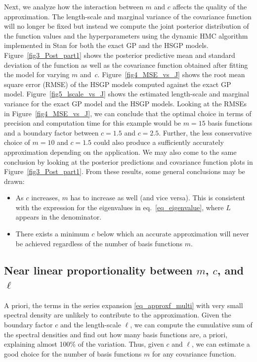 Next, we analyze how the interaction between $m$ and $c$ affects the quality of the approximation. The length-scale and marginal variance of the covariance function will no longer be fixed but instead we compute the joint posterior distribution of the function values and the hyperparameters using the dynamic HMC algorithm implemented in Stan \citep{StanTeam:2021} for both the exact GP and the HSGP models. Figure~\ref{fig3_Post_part1} shows the posterior predictive mean and standard deviation of the function as well as the covariance function obtained after fitting the model for varying $m$ and~$c$. Figure~\ref{fig4_MSE_vs_J} shows the root mean square error (RMSE) of the HSGP models computed against the exact GP model. Figure~\ref{fig5_lscale_vs_J} shows the estimated length-scale and marginal variance for the exact GP model and the HSGP models. Looking at the RMSEs in Figure~\ref{fig4_MSE_vs_J}, we can conclude that the optimal choice in terms of precision and computation time for this example would be $m = 15$ basis functions and a boundary factor between $c = 1.5$ and $c = 2.5$. Further, the less conservative choice of $m = 10$ and $c = 1.5$ could also produce a sufficiently accurately approximation depending on the application. We may also come to the same conclusion by looking at the posterior predictions and covariance function plots in Figure~\ref{fig3_Post_part1}. From these results, some general conclusions may be drawn:
%
\begin{itemize}
\item As $c$ increases, $m$ has to increase as well (and vice versa). This is consistent with the expression for the eigenvalues in eq.~\eqref{eq_eigenvalue}, where $L$ appears in the denominator.
\item There exists a minimum $c$ below which an accurate approximation will never be achieved regardless of the number of basis functions $m$.
\end{itemize}

\subsection{Near linear proportionality between $m$, $c$, and $\ell$} \label{subsec_theoretic_linearity}

A priori, the terms in the series expansion \eqref{eq_approxf_multi} with very small spectral density are unlikely to contribute to the approximation. Given the boundary factor $c$ and the length-scale $\ell$, we can compute the cumulative sum of the spectral densities and find out how many basis functions are, a priori, explaining almost 100\% of the variation. Thus, given $c$ and $\ell$, we can estimate a good choice for the number of basis functions $m$ for any covariance function.

